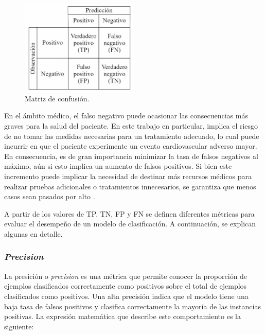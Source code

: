 \begin{figure}[h!]
	\centering
	\includegraphics[width=0.5\textwidth]{./Figures/MatrizConfusion.jpg}
	\caption{Matriz de confusión\protect\footnotemark.}\label{fig:MatrizConfusion}
\end{figure}


En el ámbito médico, el falso negativo puede ocasionar las consecuencias más graves para la salud del 
paciente. En este trabajo en particular, implica el riesgo de no tomar las medidas necesarias para un 
tratamiento adecuado, lo cual puede incurrir en que el paciente experimente un evento cardiovascular 
adverso mayor. En consecuencia, es de gran importancia minimizar la tasa de falsos negativos al máximo, 
aún si esto implica un aumento de falsos positivos. Si bien este incremento puede implicar la necesidad de 
destinar más recursos médicos para realizar pruebas adicionales o tratamientos innecesarios, se garantiza 
que menos casos sean pasados por alto \citep{CITE:40}.

\filbreak


A partir de los valores de TP, TN, FP y FN se definen diferentes métricas para evaluar el desempeño de 
un modelo de clasificación. A continuación, se explican algunas en detalle.

\subsubsection{\emph{Precision}}
La presición o \emph{precision} es una métrica que permite conocer la proporción de ejemplos clasificados 
correctamente como positivos sobre el total de ejemplos clasificados como positivos. Una alta precisión 
indica que el modelo tiene una baja tasa de falsos positivos y clasifica correctamente la mayoría de las 
instancias positivas. La expresión matemática que describe este comportamiento es la siguiente:

